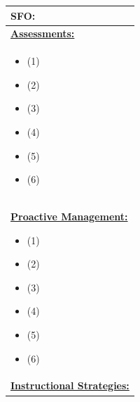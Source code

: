 \documentclass{article}
\begin{document}
\begin{longtable}{ | m{50em} | }
  \textbf{SFO:} \\
  \hline
  \underline{\textbf{Assessments:}}\\
   \begin{itemize}
        \item \footnotesize (1)
        \item \footnotesize (2)
        \item \footnotesize (3)
        \item \footnotesize (4)
        \item \footnotesize (5)
        \item \footnotesize (6)
   \end{itemize}\\
  \hline
  \underline{\textbf{Proactive Management:}}

    \begin{itemize}
        \item \footnotesize (1)
        \item \footnotesize (2)
        \item \footnotesize (3)
        \item \footnotesize (4)
        \item \footnotesize (5)
        \item \footnotesize (6)
    \end{itemize}\\
  \hline 
  \underline{\textbf{Instructional Strategies:}}\\


\end{longtable}
\end{document}
